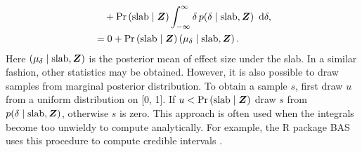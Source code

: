 \documentclass[a4paper]{article}
\newcommand{\shypo}[1]{%
	\ifnum#1>0%
		\mathrm{slab}
	\else%
		\mathrm{spike}
	\fi%
}
\newcommand{\dataZ}	{\bm{Z}}
\newcommand{\probo}{\mathrm{Pr}}
\newcommand{\prob}[1]{\probo\left(#1\right)}
\newcommand{\dx}[1]{\enspace\mathrm{d}{#1}}
\newenvironment{revision}{\color{teal}}{\color{black}}
\begin{document}
\begin{revision}
\begin{align*}
	&\quad+ \prob{\shypo{1}\mid \dataZ}\int_{-\infty}^\infty\delta \, p(\delta\mid\shypo{1}, \dataZ) \dx{\delta}, \\
	&=
	0 + 
	\prob{\shypo{1}\mid \dataZ} \left(\mu_{\delta} \mid\shypo{1}, \dataZ\right).
\end{align*}
Here $\left(\mu_{\delta} \mid\shypo{1}, \dataZ\right)$ is the posterior mean of effect size under the slab. In a similar fashion, other statistics may be obtained. However, it is also possible to draw samples from marginal posterior distribution. To obtain a sample $s$, first draw $u$ from a uniform distribution on [0, 1]. If $u<\prob{\shypo{1}\mid \dataZ}$ draw $s$ from $p(\delta\mid\shypo{1}, \dataZ)$, otherwise $s$ is zero. This approach is often used when the integrals become too unwieldy to compute analytically. For example, the R package BAS uses this procedure to compute credible intervals \parencite{ClydeEtAl2011}.

\end{revision}
\end{document}
